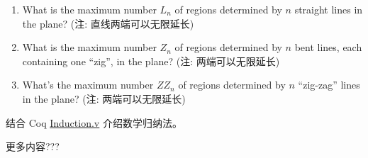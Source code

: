 \documentclass[a4paper, justified]{tufte-handout}
\begin{document}
\begin{solution}
\end{solution}

\begin{problem}
\end{problem}

\begin{solution}
\end{solution}

\begin{problem}
  \begin{enumerate}[(1)]
    \item What is the maximum number $L_n$ of regions 
      determined by $n$ straight lines in the plane?
      (注: 直线两端可以无限延长)
    \item What is the maximum number $Z_n$ of regions 
      determined by $n$ bent lines, each containing one ``zig'', 
      in the plane?
      (注: 两端可以无限延长)
    \item What's the maximum number $ZZ_n$ of regions
      determined by $n$ ``zig-zag'' lines in the plane?
      (注: 两端可以无限延长)
  \end{enumerate}
\end{problem}

\begin{solution}
\end{solution}

\beginoptional

\begin{problem}[]
\end{problem}

\begin{solution}
\end{solution}

\beginot

\begin{ot}[Coq]
  结合 Coq \href{https://github.com/hengxin/problem-solving-class-coq/blob/master/2019-1-coq/Induction.v}{Induction.v}
  介绍数学归纳法。

  更多内容???
\end{ot}
\end{document}
